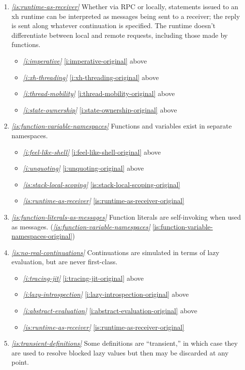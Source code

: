 \documentclass{report}
\makeatletter
\newcommand*{\Label}[2]{%
  \@bsphack
  \begingroup
    \label{#1-original}%
    \def\@currentlabel{#2}%
    \label{#1}%
  \endgroup
  \@esphack
}
\newcommand{\refboth}[1]{{\em \ref{#1}} \ref{#1-original}}
\makeatother
\begin{document}
\begin{enumerate}
\item{}\Label{is:runtime-as-receiver}{xhs.runtimereceiver}{\em\ref{is:runtime-as-receiver}}
  Whether via RPC or locally, statements issued to an xh runtime can be
  interpreted as messages being sent to a receiver; the reply is sent along
  whatever continuation is specified. The runtime doesn't differentiate
  between local and remote requests, including those made by functions.
\begin{itemize}
\item \refboth{i:imperative} above
\item \refboth{i:xh-threading} above
\item \refboth{i:thread-mobility} above
\item \refboth{i:state-ownership} above
\end{itemize}
\item{}\Label{is:function-variable-namespaces}{xhs.namespaces}{\em\ref{is:function-variable-namespaces}}
  Functions and variables exist in separate namespaces.
\begin{itemize}
\item \refboth{i:feel-like-shell} above
\item \refboth{i:unquoting} above
\item \refboth{is:stack-local-scoping}
\item \refboth{is:runtime-as-receiver}
\end{itemize}
\item{}\Label{is:function-literals-as-messages}{xhs.fnliterals}{\em\ref{is:function-literals-as-messages}}
  Function literals are self-invoking when used as messages.
(\refboth{is:function-variable-namespaces})
\item{}\Label{is:no-real-continuations}{nocallcc}{\em\ref{is:no-real-continuations}}
  Continuations are simulated in terms of lazy evaluation, but are never
  first-class.
\begin{itemize}
\item \refboth{i:tracing-jit} above
\item \refboth{i:lazy-introspection} above
\item \refboth{i:abstract-evaluation} above
\item \refboth{is:runtime-as-receiver}
\end{itemize}
\item{}\Label{is:transient-definitions}{xhs.transientdefs}{\em\ref{is:transient-definitions}}
  Some definitions are ``transient,'' in which case they are used to
  resolve blocked lazy values but then may be discarded at any point.

\end{enumerate}
\end{document}
